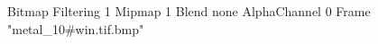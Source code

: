 {Bitmap
	{Filtering 1}
	{Mipmap 1}
	{Blend none}
	{AlphaChannel 0}
	{Frame "metal_10#win.tif.bmp"}
}
